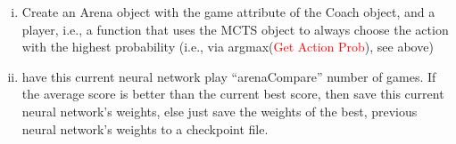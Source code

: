 \documentclass[12pt]{article}
\begin{document}
\begin{redenum}
\begin{enumerate}[A.)]
\begin{enumerate}[I.)]
\begin{enumerate}[i.)]
				\item Create an Arena object with the game attribute of the Coach object, and a player, i.e., a function that uses the MCTS object to always choose the action with the highest probability (i.e., via argmax(\textcolor{red}{Get Action Prob}), see above)
				\item have this current neural network play ``arenaCompare'' number of games. If the average score is better than the current best score, then save this current neural network's weights, else just save the weights of the best, previous neural network's weights to a checkpoint file.
			\end{enumerate}
		\end{enumerate}
	\end{enumerate}
\end{redenum}
\end{document}
